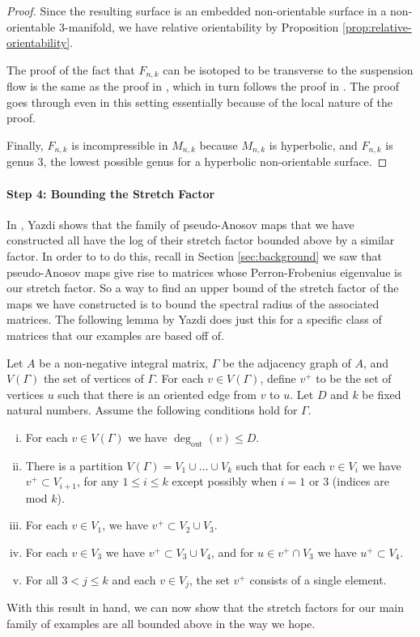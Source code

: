 \begin{proof}
  Since the resulting surface is an embedded non-orientable surface in a non-orientable $3$-manifold, we have
  relative orientability by Proposition \ref{prop:relative-orientability}.

  The proof of the fact that $F_{n,k}$ can be isotoped to be transverse to the suspension flow is the same as the
  proof in \cite{yazdi2018pseudo}, which in turn follows the proof in \cite{leininger2013number}. The proof goes
  through even in this setting essentially because of the local nature of the proof.

  Finally, $F_{n,k}$ is incompressible in $M_{n,k}$ because $M_{n,k}$ is hyperbolic, and $F_{n,k}$ is genus $3$, the
  lowest possible genus for a hyperbolic non-orientable surface.
\end{proof}

\paragraph{Step 4: Bounding the Stretch Factor}

In \cite{yazdi2018pseudo}, Yazdi shows that the family of pseudo-Anosov maps that we have constructed all have
the log of their stretch factor bounded above by a similar factor. In order to to do this, recall in Section
\ref{sec:background} we saw that pseudo-Anosov maps give rise to matrices whose Perron-Frobenius eigenvalue is
our stretch factor. So a way to find an upper bound of the stretch factor of the maps we have constructed is
to bound the spectral radius of the associated matrices. The following lemma by Yazdi does just this for a
specific class of matrices that our examples are based off of.

\begin{lem}
\label{lem:spectral}
Let $A$ be a non-negative integral matrix, $\Gamma$ be the adjacency graph of $A$, and $V(\Gamma)$ the set of
vertices of $\Gamma$. For each $v \in V(\Gamma)$, define $v^+$ to be the set of vertices $u$ such that there
is an oriented edge from $v$ to $u$. Let $D$ and $k$ be fixed natural numbers. Assume the following conditions
hold for $\Gamma$.
\begin{enumerate}[(i)]
\item For each $v \in V(\Gamma)$ we have $\deg_{\text{out}}(v) \leq D$.
\item There is a partition $V(\Gamma) = V_1 \cup \dots \cup V_k$ such that for each $v \in V_i$ we have
  $v^+ \subset V_{i+1}$, for any $1 \leq i \leq k$ except possibly when $i = 1$ or 3 (indices are mod $k$).
\item For each $v \in V_1$, we have $v^+ \subset V_2 \cup V_3$.
\item For each $v \in V_3$ we have $v^+ \subset V_3 \cup V_4$, and for $u \in v^+ \cap V_3$ we have
  $u^+ \subset V_4$.
\item For all $3 < j \leq k$ and each $v \in V_j$, the set $v^+$ consists of a single element.
\end{enumerate}
\end{lem}
With this result in hand, we can now show that the stretch factors for our main family of examples are all
bounded above in the way we hope.

